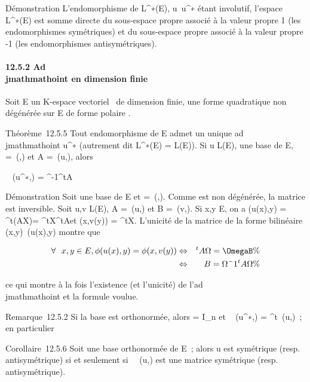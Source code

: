 \documentclass[]{article}
\begin{document}
Démonstration L'endomorphisme de L^∗(E),
u\mapsto~u^∗ étant involutif, l'espace
L^∗(E) est somme directe du sous-espace propre associé à la
valeur propre 1 (les endomorphismes symétriques) et du sous-espace
propre associé à la valeur propre -1 (les endomorphismes
antisymétriques).

\paragraph{12.5.2 Ad\\jmathmathoint en dimension finie}

Soit E un K-espace vectoriel ~de dimension finie, \Phi une forme
quadratique non dégénérée sur E de forme polaire \phi.

Théorème~12.5.5 Tout endomorphisme de E admet un unique ad\\jmathmathoint
u^∗ (autrement dit L^∗(E) = L(E)). Si u \in L(E), 
une base de E, \Omega =\
\mathrmMat (\phi,) et A =\
\mathrmMat (u,), alors

\mathrmMat~
(u^∗,) = \Omega^-1^tA\Omega

Démonstration Soit \mathcal{E} une base de E et \Omega =\
\mathrmMat (\phi,). Comme \phi est non dégénérée, la
matrice \Omega est inversible. Soit u,v \in L(E), A =\
\mathrmMat (u,) et B =\
\mathrmMat (v,). Si x,y \in E, on a \phi(u(x),y) =
^t(AX)\OmegaY = ^tX^tA\OmegaY et \phi(x,v(y)) =
^tX\OmegaBY . L'unicité de la matrice de la forme bilinéaire
(x,y)\mapsto~\phi(u(x),y) montre que

\begin{align*} \forall~~x,y \in E,
\phi(u(x),y) = \phi(x,v(y))& \Leftrightarrow & ^tA\Omega
= \OmegaB \%& \\ &
\Leftrightarrow & B = \Omega^-1^tA\Omega\%&
\\ \end{align*}

ce qui montre à la fois l'existence (et l'unicité) de l'ad\\jmathmathoint et la
formule voulue.

Remarque~12.5.2 Si la base  est orthonormée, alors \Omega = I_n et
\mathrmMat~
(u^∗,) = ^t\
\mathrmMat (u,)~; en particulier

Corollaire~12.5.6 Soit \mathcal{E} une base orthonormée de E~; alors u est
symétrique (resp. antisymétrique) si et seulement
si~\mathrmMat~ (u,\mathcal{E}) est une
matrice symétrique (resp. antisymétrique).
\end{document}
